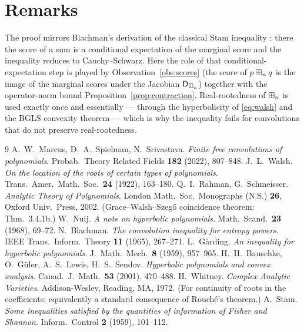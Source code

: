 \section*{Remarks}

The proof mirrors Blachman's \cite{Blachman} derivation of the classical Stam
inequality \cite{Stam}: there the score of a sum is a conditional expectation of
the marginal score and the inequality reduces to Cauchy--Schwarz. Here the role
of that conditional-expectation step is played by
Observation~\ref{obs:scores} (the score of $p\boxplus_n q$ is the image of the marginal
scores under the Jacobian $\mathsf{D}_{\boxplus_n}$) together with the operator-norm bound
Proposition~\ref{prop:contraction}. Real-rootedness of $\boxplus_n$ is used exactly
once and essentially — through the hyperbolicity of \eqref{eq:walsh} and the
BGLS convexity theorem — which is why the inequality fails for convolutions that
do not preserve real-rootedness.

\begin{thebibliography}{9}
 A.~W.~Marcus, D.~A.~Spielman, N.~Srivastava.
  \emph{Finite free convolutions of polynomials}.
  Probab.\ Theory Related Fields \textbf{182} (2022), 807--848.
 J.~L.~Walsh.
  \emph{On the location of the roots of certain types of polynomials}.
  Trans.\ Amer.\ Math.\ Soc.\ \textbf{24} (1922), 163--180.
 Q.~I.~Rahman, G.~Schmeisser.
  \emph{Analytic Theory of Polynomials}.
  London Math.\ Soc.\ Monographs (N.S.) \textbf{26}, Oxford Univ.\ Press, 2002.
  (Grace--Walsh--Szeg\H{o} coincidence theorem: Thm.~3.4.1b.)
 W.~Nuij.
  \emph{A note on hyperbolic polynomials}.
  Math.\ Scand.\ \textbf{23} (1968), 69--72.
 N.~Blachman.
  \emph{The convolution inequality for entropy powers}.
  IEEE Trans.\ Inform.\ Theory \textbf{11} (1965), 267--271.
 L.~G\aa rding.
  \emph{An inequality for hyperbolic polynomials}.
  J.\ Math.\ Mech.\ \textbf{8} (1959), 957--965.
 H.~H.~Bauschke, O.~G\"uler, A.~S.~Lewis, H.~S.~Sendov.
  \emph{Hyperbolic polynomials and convex analysis}.
  Canad.\ J.\ Math.\ \textbf{53} (2001), 470--488.
 H.~Whitney.
  \emph{Complex Analytic Varieties}.
  Addison-Wesley, Reading, MA, 1972. (For continuity of roots in the
  coefficients; equivalently a standard consequence of Rouch\'e's theorem.)
 A.~Stam.
  \emph{Some inequalities satisfied by the quantities of information of Fisher
  and Shannon}. Inform.\ Control \textbf{2} (1959), 101--112.
\end{thebibliography}

\endgroup